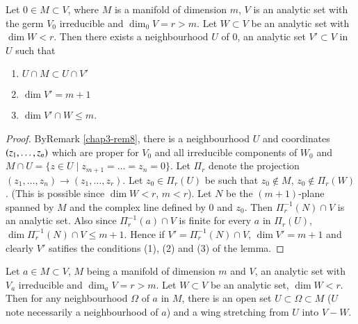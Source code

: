 \begin{lemma}\label{chap3-lem2} %
  Let $0 \in M \subset V$, where $M$ is a manifold of dimension $m$, $V$
  is an analytic set with the germ $V_{0}$ irreducible and $\dim_{0} V
  = r> m$. Let $W\subset V$ be an analytic set with $\dim W < r$. Then
  there exists a neighbourhood $U$ of $0$, an 
  analytic set $V' \subset V$ in $U$ such that  
  \begin{enumerate}[\rm (1)]
  \item $U \cap M \subset U \cap V'$
  \item $\dim V' = m+1$
  \item $\dim V' \cap W \leq m$.
  \end{enumerate}
\end{lemma} 

\begin{proof} %
  By\pageoriginale Remark \ref{chap3-rem8}, there is a neighbourhood $U$ and
  coordinates $(z_{1},\break \ldots, z_{n})$ which are proper for $V_{0}$ and
  all irreducible 
  components of $W_{0}$ and $M \cap U = \big\{ z \in U \mid
  z_{m+1} = \ldots = z_{n} = 0\big\}$. Let $\Pi_{r}$ denote the
  projection $(z_{1}, \ldots , z_{n}) \to (z_{1}, \ldots ,
  z_{r})$. Let $z_{0} \in \Pi_{r}(U)$ be such that $z_{0}
  \notin M$, $z_{0} \notin \Pi_{r}(W)$. (This is possible since 
  $\dim  W < r$, $m< r$). 
  Let $N$ be the $(m+1)$-plane spanned by $M$ and the complex line
  defined by $0$ and $z_{0}$. Then $\Pi^{-1}_{r} (N) \cap V$ is
  an analytic set. Also since $\Pi^{-1}_{r}(a) \cap V$ is finite for
  every $a$ in $\Pi_{r}(U)$, $\dim \Pi^{-1}_{r}(N) \cap V \leq m+1$. 
  Hence if $V' = \Pi^{-1}_{r}(N) \cap V$, $\dim V' = m+1$ and clearly 
  $V'$ satifies the conditions (1), (2) and (3) of the lemma. 
\end{proof}

\begin{proposition}\label{chap3-prop3} %
  Let $a \in M \subset V$, $M$ being a manifold of dimension $m$ and
  $V$, an analytic set with $V_{a}$ irreducible and $\dim_{a} V= r
  >m$. Let $W \subset V$ be an analytic set, $\dim  W <r$. Then for
  any neighbourhood 
  $\Omega$ of $a$ in $M$, there is an open set $U \subset \Omega
  \subset M$ ($U$ note necessarily a neighbourhood of $a$) and a wing
  stretching from $U$ into $V-W$. 
\end{proposition}

